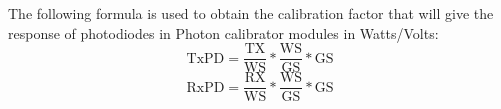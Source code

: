 The following formula is used to obtain the calibration factor that will give the response of photodiodes in Photon calibrator modules in Watts/Volts:
\
\begin{equation}
\mathrm{TxPD} = \frac{\mathrm{TX}}{\mathrm{WS}}*\frac{\mathrm{WS}}{\mathrm{GS}}*\mathrm{GS}
\end{equation}
\begin{equation}
\mathrm{RxPD} = \frac{\mathrm{RX}}{\mathrm{WS}}*\frac{\mathrm{WS}}{\mathrm{GS}}*\mathrm{GS}
\end{equation}
%
